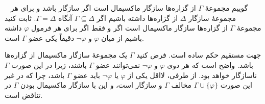 ~
گوییم مجموعهٔ
$\Gamma$
از گزاره‌ها
سازگار ماکسیمال است اگر سازگار باشد و برای هر مجموعهٔ سازگار
$\Delta$
از گزاره‌ها داشته باشیم اگر
$\Gamma\subseteq\Delta$
آنگاه
$\Gamma=\Delta$. ثابت کنید مجموعهٔ
$\Gamma$
از گزاره‌ها سازگار ماکسیمال است اگر و فقط اگر برای هر فرمول
$\varphi$
داشته باشیم از میان
$\varphi$
و
$\neg\varphi$
دقیقاً یکی عضو
$\Gamma$
است.
\begin{ans}
  جهت مستقیم حکم ساده است. فرض کنید $\Gamma$ یک مجموعهٔ سازگار ماکسیمال از گزاره‌ها باشد. واضح است که هر دوی $\varphi$ و $\neg \varphi$ نمی‌توانند عضو $\Gamma$ باشند، زیرا در این صورت $\Gamma$ ناسازگار خواهد بود. از طرفی، لااقل یکی از $\varphi$ یا $\neg \varphi$ باید عضو $\Gamma$ باشد، چرا که در غیر این صورت $\Gamma \cup \{\varphi\}$ مخالف $\Gamma$ و سازگار است، و این با سازگار ماکسیمال بودن $\Gamma$ در تناقض است.
\end{ans}
